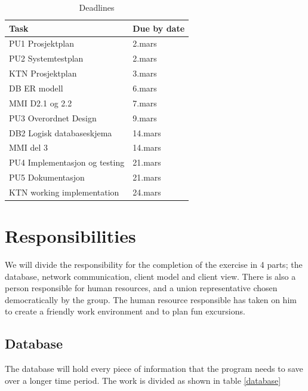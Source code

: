 \documentclass[a4paper, english, 12pt]{article}
\begin{document}
\begin{table}[h!]
    \begin{center}
    \caption{Deadlines} 
    \label{deadline}
    \vspace{0,5cm}
    \begin{tabular}{| l | l |}  
        \hline
        Task & Due by date \\
        \hline 
    PU1  Prosjektplan & 2.mars \\
    PU2  Systemtestplan & 2.mars\\
    KTN  Prosjektplan & 3.mars\\
    DB   ER modell& 6.mars\\
    MMI  D2.1 og 2.2 & 7.mars\\
    PU3  Overordnet Design & 9.mars\\
    DB2  Logisk databaseskjema & 14.mars\\
    MMI  del 3 & 14.mars\\
    PU4  Implementasjon og testing & 21.mars\\
    PU5  Dokumentasjon & 21.mars\\
    KTN  working implementation & 24.mars\\
        \hline
    \end{tabular}
    \end{center}
\end{table}



\section{Responsibilities}
We will divide the responsibility for the completion of the exercise in 4 parts; the database, network communication, client model and client view.  There is also a person responsible for human resources, and a union representative chosen democratically by the group. The human resource responsible has taken on him to create a friendly work environment and to plan fun excursions.

\subsection{Database}
The database will hold every piece of information that the program needs to save over a longer time period. The work is divided as shown in table \ref{database}
\end{document}
